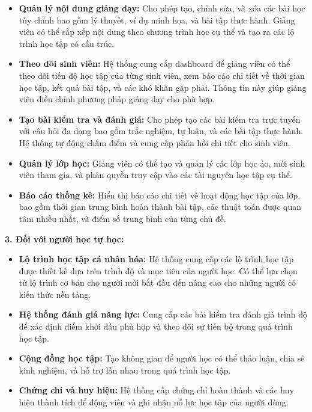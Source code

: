 \begin{itemize}
\item \textbf{Quản lý nội dung giảng dạy:} Cho phép tạo, chỉnh sửa, và xóa các bài học tùy chỉnh bao gồm lý thuyết, ví dụ minh họa, và bài tập thực hành. Giảng viên có thể sắp xếp nội dung theo chương trình học cụ thể và tạo ra các lộ trình học tập có cấu trúc.

\item \textbf{Theo dõi sinh viên:} Hệ thống cung cấp dashboard để giảng viên có thể theo dõi tiến độ học tập của từng sinh viên, xem báo cáo chi tiết về thời gian học tập, kết quả bài tập, và các khó khăn gặp phải. Thông tin này giúp giảng viên điều chỉnh phương pháp giảng dạy cho phù hợp.

\item \textbf{Tạo bài kiểm tra và đánh giá:} Cho phép tạo các bài kiểm tra trực tuyến với câu hỏi đa dạng bao gồm trắc nghiệm, tự luận, và các bài tập thực hành. Hệ thống tự động chấm điểm và cung cấp phản hồi chi tiết cho sinh viên.

\item \textbf{Quản lý lớp học:} Giảng viên có thể tạo và quản lý các lớp học ảo, mời sinh viên tham gia, và phân quyền truy cập vào các tài nguyên học tập cụ thể.

\item \textbf{Báo cáo thống kê:} Hiển thị báo cáo chi tiết về hoạt động học tập của lớp, bao gồm thời gian trung bình hoàn thành bài tập, các thuật toán được quan tâm nhiều nhất, và điểm số trung bình của từng chủ đề.
\end{itemize}

\textbf{3. Đối với người học tự học:}

\begin{itemize}
\item \textbf{Lộ trình học tập cá nhân hóa:} Hệ thống cung cấp các lộ trình học tập được thiết kế dựa trên trình độ và mục tiêu của người học. Có thể lựa chọn từ lộ trình cơ bản cho người mới bắt đầu đến nâng cao cho những người có kiến thức nền tảng.

\item \textbf{Hệ thống đánh giá năng lực:} Cung cấp các bài kiểm tra đánh giá trình độ để xác định điểm khởi đầu phù hợp và theo dõi sự tiến bộ trong quá trình học tập.

\item \textbf{Cộng đồng học tập:} Tạo không gian để người học có thể thảo luận, chia sẻ kinh nghiệm, và hỗ trợ lẫn nhau trong quá trình học tập.

\item \textbf{Chứng chỉ và huy hiệu:} Hệ thống cấp chứng chỉ hoàn thành và các huy hiệu thành tích để động viên và ghi nhận nỗ lực học tập của người dùng.
\end{itemize}


